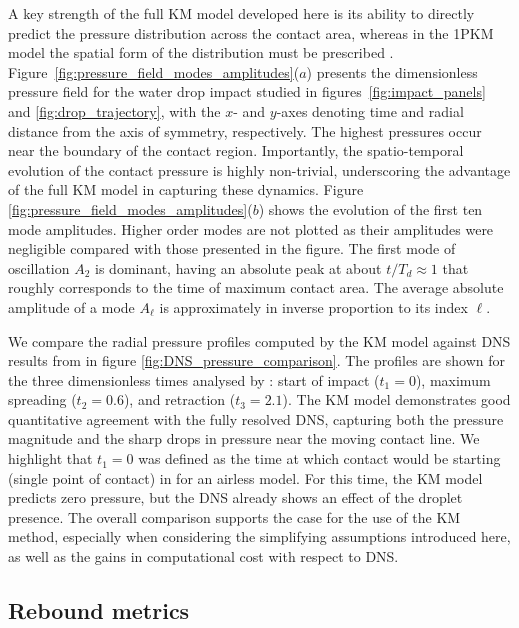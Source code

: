 \documentclass{jfm}
\begin{document}
A key strength of the full KM model developed here is its ability to directly predict the pressure distribution across the contact area, whereas in the 1PKM model the spatial form of the distribution must be prescribed \citep{AlventosaEtAl2023}. Figure~\ref{fig:pressure_field_modes_amplitudes}($a$) presents the dimensionless pressure field for the water drop impact studied in figures~\ref{fig:impact_panels} and \ref{fig:drop_trajectory}, with the $x$- and $y$-axes denoting time and radial distance from the axis of symmetry, respectively. The highest pressures occur near the boundary of the contact region. Importantly, the spatio-temporal evolution of the contact pressure is highly non-trivial, underscoring the advantage of the full KM model in capturing these dynamics. Figure \ref{fig:pressure_field_modes_amplitudes}($b$) shows the evolution of the first ten mode amplitudes. Higher order modes are not plotted as their amplitudes were negligible compared with those presented in the figure. The first mode of oscillation $A_2$ is dominant, having an absolute peak at about $t/T_d \approx 1$ that roughly corresponds to the time of maximum contact area. The average absolute amplitude of a mode $A_\ell$ is approximately in inverse proportion to its index $\ell$. 

We compare the radial pressure profiles computed by the KM model against DNS results from \cite{AlventosaEtAl2023} in figure \ref{fig:DNS_pressure_comparison}. The profiles are shown for the three dimensionless times analysed by \citet{AlventosaEtAl2023}: start of impact ($t_1=0$), maximum spreading ($t_2=0.6$), and retraction ($t_3=2.1$). The KM model demonstrates good quantitative agreement with the fully resolved DNS, capturing both the pressure magnitude and the sharp drops in pressure near the moving contact line. We highlight that $t_1 = 0$ was defined as the time at which contact would be starting (single point of contact) in \citet{AlventosaEtAl2023} for an airless model. For this time, the KM model predicts zero pressure, but the DNS already shows an effect of the droplet presence. The overall comparison supports the case for the use of the KM method, especially when considering the simplifying assumptions introduced here, as well as the gains in computational cost with respect to DNS.



\subsection{Rebound metrics} \label{subsec:ReboundMetrics}
\end{document}
